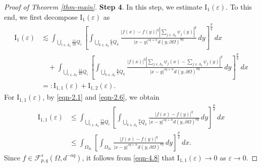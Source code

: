\documentclass[11pt,twoside]{article}
\def\cf{{\mathcal F}}
\def\Qi{\frac{11}{10}Q_i}
\def\Qkk{\frac{6}{5}Q_k}
\def\boz{{\Omega}}
\def\vez{\varepsilon}
\def\pa{\partial}                %
\def\huafwe{{\cf}_{p,q}^s(\boz,d^{-aq})}
\theoremstyle{mylem}
\theoremstyle{definition}
\numberwithin{equation}{section}
\begin{document}
\begin{proof}[Proof of Theorem \ref{thm-main}]
{\bf Step 4}. In this step, we estimate \( \mathrm{I}_1(\vez) \). To this end, we first decompose \( \mathrm{I}_1(\vez) \) as
\begin{align*}
\mathrm{I}_1(\vez)
&\lesssim \int_{\bigcup_{i \in \Lambda_2} \Qi} \left[ \int_{\bigcup_{k \in \Lambda_2} \Qkk} \frac{| f(x) - f(y)|^q |\sum_{j \in \Lambda_2} \psi_j(y)|^q}{|x - y|^{s q + n}d(y,\pa\boz)^{aq}}\,dy \right]^{\frac{p}{q}}\,dx \\
&\quad+ \int_{\bigcup_{i \in \Lambda_2} \Qi} \left[ \int_{\bigcup_{k \in \Lambda_2} \Qkk} \frac{| f(x)|^q |\sum_{j \in \Lambda_2} \psi_j(x) - \sum_{j \in \Lambda_2} \psi_j(y)|^q}{|x - y|^{s q + n}d(y,\pa\boz)^{aq}}\,dy \right]^{\frac{p}{q}}\,dx \\
&=: \mathrm{I}_{1,1}(\vez) + \mathrm{I}_{1,2}(\vez).
\end{align*}
For \( \mathrm{I}_{1,1}(\vez) \), by \eqref{eqn-2.1} and \eqref{eqn-2.6}, we obtain
\begin{align}\label{eqn-4.8}
\mathrm{I}_{1,1}(\vez)
&\leq \int_{\bigcup_{i \in \Lambda_2} \Qi} \left[ \int_{\bigcup_{k \in \Lambda_2} \Qkk} \frac{| f(x) - f(y)|^q}{|x - y|^{s q + n}d(y,\pa\boz)^{aq}}\,dy \right]^{\frac{p}{q}}\,dx \nonumber \\
&\leq \int_{\Omega_{3\varepsilon}} \left[ \int_{\Omega_{3\varepsilon}} \frac{| f(x) -  f(y)|^q}{|x - y|^{s q + n}d(y,\pa\boz)^{aq}}\,dy \right]^{\frac{p}{q}}\,dx.
\end{align}
Since \( f \in \huafwe \), it follows from \eqref{eqn-4.8} that $\mathrm{I}_{1,1}(\vez)\to 0$ as \( \varepsilon \to 0 \).


\end{proof}
\end{document}
